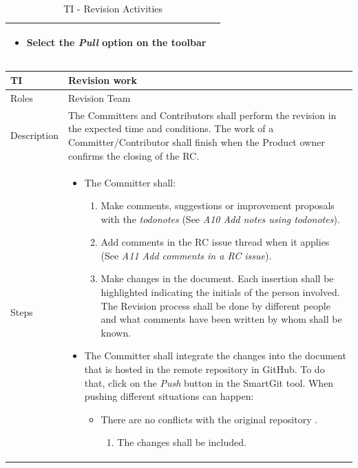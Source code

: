 \documentclass{template/openetcs_article}
\begin{document}
\begin{table}[H]
\begin{tabular}{|m{2cm}|m{12cm}|}
\begin{itemize}
\begin{itemize}
\begin{itemize}
\item Select the {\it Pull} option on the toolbar
\end{itemize}
\end{itemize}
\end{itemize}
\\\hline
\end{tabular}
\caption{TI - Revision Activities}
\end{table}


\begin{table}[H]
\begin{tabular}{|m{2cm}|m{12cm}|}
\hline
\rowcolor{myblue}
TI & 
Revision work
\\\hline
Roles &
Revision Team
\\\hline
Description &
The Committers and Contributors shall perform the revision in the expected time and conditions. The work of a Committer/Contributor shall finish when the Product owner confirms the closing of the RC.
\\\hline
Steps &
\begin{itemize}
\item The Committer shall:
\begin{enumerate}
\item Make comments, suggestions or improvement proposals with the {\it todonotes} (See {\it A10 Add notes using todonotes}).
\item Add comments in the RC issue thread when it applies (See {\it A11 Add comments in a RC issue}).
\item Make changes in the document. Each insertion shall be highlighted indicating the initials of the person involved. The Revision process shall be done by different people and what comments have been written by whom shall be known.
\end{enumerate}
\item The Committer shall integrate the changes into the document that is hosted in the remote repository in GitHub. To do that, click on the {\it Push} button in the SmartGit tool. When pushing different situations can happen:
\begin{itemize}
\item There are no conflicts with the original repository .
\begin{enumerate}
\item The changes shall be included.
\end{enumerate}
\end{itemize}
\begin{itemize}

\end{itemize}
\end{itemize}
\end{tabular}
\end{table}
\end{document}
